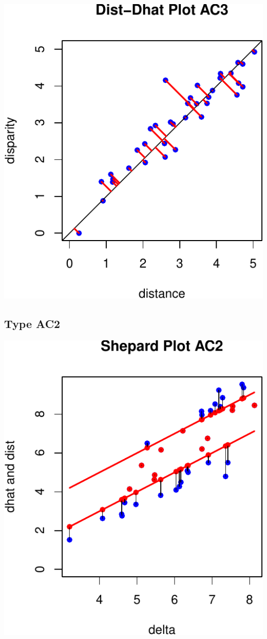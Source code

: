 \documentclass[
  12pt,
]{article}
\begin{document}
\begin{center}\includegraphics{smacofAC_files/figure-latex/gruijterh10-3} \end{center}

\subsection{Type AC2}\label{type-ac2-1}

\begin{center}\includegraphics{smacofAC_files/figure-latex/gruijterh01-1} \end{center}
\end{document}

